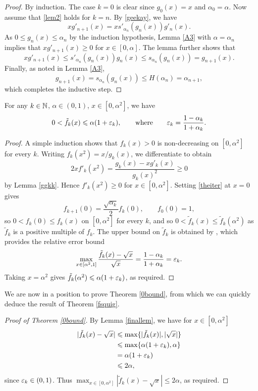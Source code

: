 \begin{appendices}
\begin{proof}
By induction. The case $k=0$ is clear since $g_0(x)=x$ and $\alpha_0=\alpha$. Now assume that \eqref{lem2} holds for $k=n$. By \eqref{geekay}, we have
\[xg'_{n+1}(x)=xs'_{\alpha_n}(g_n(x))g'_n(x).\]
As $0\leq g_n(x)\leq \alpha_n$ by the induction hypothesis, Lemma \ref{A3} with $\alpha=\alpha_n$ implies that $xg'_{n+1}(x)\geq 0$ for $x \in [0,\alpha]$. The lemma further shows that
\[xg'_{n+1}(x) \leq s'_{\alpha_n}(g_n(x))g_n(x) \leq s_{\alpha_n}(g_n(x)) = g_{n+1}(x).\]
Finally, as noted in Lemma \ref{A3},
\[g_{n+1}(x) = s_{\alpha_n}(g_n(x)) \leq H(\alpha_n) = \alpha_{n+1},\]
which completes the inductive step.
\end{proof}

\begin{lemma}\label{finallem}
For any $k \in \mathbb{N}$, $\alpha \in (0,1)$, $x \in [0,\alpha^2]$, we have
\[0 < \tilde{f}_k(x) \leqslant \alpha(1+\varepsilon_k), \qquad \text{where}\qquad  \varepsilon_k=\dfrac{1-\alpha_k}{1+\alpha_k}.\]
\end{lemma}


\begin{proof}
A simple induction shows that $f_k(x)>0$ is non-decreasing on $[0,\alpha^2]$ for every $k$. Writing $f_k(x^2)=x/g_k(x)$, we differentiate to obtain
\[2xf'_k(x^2) = \dfrac{g_k(x)-xg'_k(x)}{g_k(x)^2} \geq 0\]
by Lemma \ref{ggkk}. Hence $f'_k(x^2)\geq 0$ for $x \in [0,\alpha^2]$. Setting \eqref{theiter} at $x=0$ gives
\[f_{k+1}(0)=\dfrac{\sqrt{\alpha_k}}{2}f_k(0), \qquad f_0(0)=1,\]
so $0<f_k(0)\leq f_k(x)$ on $[0,\alpha^2]$ for every $k$, and so $0<\tilde{f}_k(x)\leq \tilde{f}_k(\alpha^2)$ as $\tilde{f}_k$ is a positive multiple of $f_k$. The upper bound on $\tilde{f}_k$ is obtained by \cite[Theorem 3.1]{Gawlik}, which provides the relative error bound
\[\max_{x\in[\alpha^2,1]}\dfrac{\tilde{f}_k(x)-\sqrt{x}}{\sqrt{x}}=\dfrac{1-\alpha_k}{1+\alpha_k}=\varepsilon_k.\]
Taking $x=\alpha^2$ gives $\tilde{f}_k(\alpha^2) \leqslant \alpha(1+\varepsilon_k)$, as required.
\end{proof}

We are now in a position to prove Theorem \ref{0bound}, from which we can quickly deduce the result of Theorem \ref{fsquig}.

\begin{proof}[Proof of Theorem \ref{0bound}]
By Lemma \ref{finallem}, we have for $x\in [0,\alpha^2]$
\begin{align*}
    |\tilde{f}_k(x)-\sqrt{x}| &\leqslant \max\{|\tilde{f}_k(x)|,|\sqrt{x}|\}\\
    &\leqslant \max\{\alpha(1+\varepsilon_k),\alpha\}\\
    &=\alpha(1+\varepsilon_k)\\
    &\leqslant 2\alpha,
\end{align*}
since $\varepsilon_k \in (0,1)$. Thus $\max_{x\in[0,\alpha^2]}|\tilde{f}_k(x)-\sqrt{x}|\leq 2\alpha$, as required.
\end{proof}


\end{appendices}
